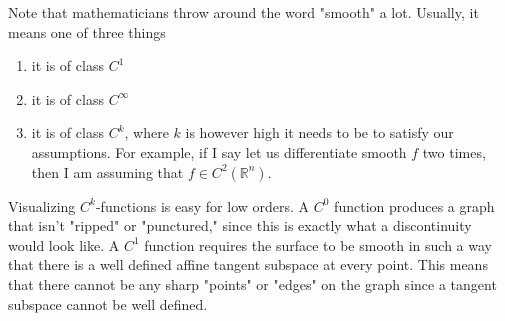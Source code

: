   Note that mathematicians throw around the word "smooth" a lot. Usually, it means one of three things
  \begin{enumerate}
      \item it is of class $C^1$ 
      \item it is of class $C^\infty$
      \item it is of class $C^k$, where $k$ is however high it needs to be to satisfy our assumptions. For example, if I say let us differentiate smooth $f$ two times, then I am assuming that $f \in C^2 (\mathbb{R}^n)$. 
  \end{enumerate}
  Visualizing $C^k$-functions is easy for low orders. A $C^0$ function produces a graph that isn't "ripped" or "punctured," since this is exactly what a discontinuity would look like. A $C^1$ function requires the surface to be smooth in such a way that there is a well defined affine tangent subspace at every point. This means that there cannot be any sharp "points" or "edges" on the graph since a tangent subspace cannot be well defined. 


